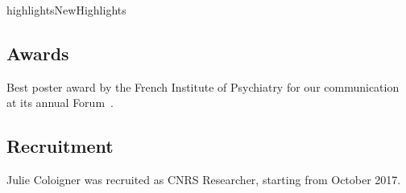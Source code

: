 \documentclass{ra2018}
\begin{document}

\begin{module}{highlights}{NewHighlights}{}

\subsection{Awards}

Best poster award by the French Institute of Psychiatry for our communication at its annual Forum~.


\subsection{Recruitment}

    Julie Coloigner was recruited as CNRS Researcher, starting from October 2017.


\end{module}

\end{document}
